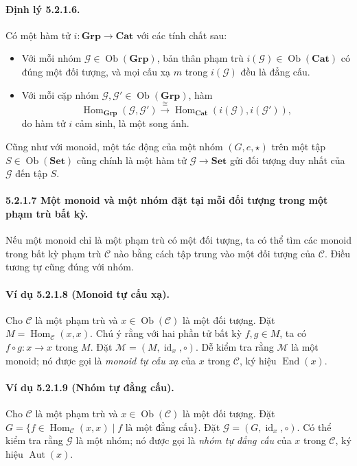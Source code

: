\paragraph{Định lý 5.2.1.6.} Có một hàm tử $i:\mathbf{Grp}\to\mathbf{Cat}$ với các tính chất sau:
\begin{itemize}
\item Với mỗi nhóm $\mathcal G\in\operatorname{Ob}(\mathbf{Grp})$, bản thân phạm trù $i(\mathcal G)\in\operatorname{Ob}(\mathbf{Cat})$ có đúng một đối tượng, và mọi cấu xạ $m$ trong $i(\mathcal G)$ đều là đẳng cấu.
\item Với mỗi cặp nhóm $\mathcal G,\mathcal G'\in\operatorname{Ob}(\mathbf{Grp})$, hàm
\[\operatorname{Hom}_{\mathbf{Grp}}(\mathcal G,\mathcal G')\xrightarrow{\cong}\operatorname{Hom}_{\mathbf{Cat}}(i(\mathcal G),i(\mathcal G')),\]
do hàm tử $i$ cảm sinh, là một song ánh.
\end{itemize}
Cũng như với monoid, một tác động của một nhóm $(G,e,\star)$ trên một tập $S\in\operatorname{Ob}(\mathbf{Set})$ cũng chính là một hàm tử $\mathcal G\to\mathbf{Set}$ gửi đối tượng duy nhất của $\mathcal G$ đến tập $S$.
\paragraph{5.2.1.7 Một monoid và một nhóm đặt tại mỗi đối tượng trong một phạm trù bất kỳ.} Nếu một monoid chỉ là một phạm trù có một đối tượng, ta có thể tìm các monoid trong bất kỳ phạm trù $\mathcal C$ nào bằng cách tập trung vào một đối tượng của $\mathcal C$. Điều tương tự cũng đúng với nhóm.
\paragraph{Ví dụ 5.2.1.8 (Monoid tự cấu xạ).} Cho $\mathcal C$ là một phạm trù và $x\in\operatorname{Ob}(\mathcal C)$ là một đối tượng. Đặt $M=\operatorname{Hom}_{\mathcal C}(x,x)$. Chú ý rằng với hai phần tử bất kỳ $f,g\in M$, ta có $f\circ g:x\to x$ trong $M$. Đặt $\mathcal M=(M,\operatorname{id}_x,\circ)$. Dễ kiểm tra rằng $\mathcal M$ là một monoid; nó được gọi là \emph{monoid tự cấu xạ} của $x$ trong $\mathcal C$, ký hiệu $\operatorname{End}(x)$.
\paragraph{Ví dụ 5.2.1.9 (Nhóm tự đẳng cấu).} Cho $\mathcal C$ là một phạm trù và $x\in\operatorname{Ob}(\mathcal C)$ là một đối tượng. Đặt $G=\{f\in\operatorname{Hom}_{\mathcal C}(x,x)\mid f\text{ là một đẳng cấu}\}$. Đặt $\mathcal G=(G,\operatorname{id}_x,\circ)$. Có thể kiểm tra rằng $\mathcal G$ là một nhóm; nó được gọi là \emph{nhóm tự đẳng cấu} của $x$ trong $\mathcal C$, ký hiệu $\operatorname{Aut}(x)$.
